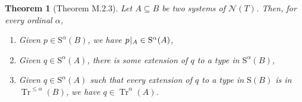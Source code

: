 \documentclass{article}
\newtheorem{theorem}{Theorem}[section]
\theoremstyle{nonumberplain}
\newcommand{\calN}{\mathcal{N}}
\newcommand{\Stone}{\mathrm{S}}
\DeclareMathOperator{\Tr}{Tr}
\newcommand{\rst}[2]{#1\mspace{1.3mu plus 0.5mu minus 0.5mu}|_{#2}}
\begin{document}
\begin{theorem}[Theorem M.2.3]\label{thm:2.3}
Let $A \subseteq B$ be two systems of $\calN(T)$. Then, for every ordinal $\alpha$,
\begin{enumerate}[label=(\roman*)]
\item\label{item:thm2.3:i} Given $p \in \Stone^\alpha(B)$, we have $\rst p A \in \Stone^\alpha(A)$,
\item\label{item:thm2.3:ii} Given $q \in \Stone^\alpha(A)$, there is some extension of $q$ to a type in $\Stone^\alpha(B)$,
\item\label{item:thm2.3:iii} Given $q \in \Stone^\alpha(A)$ such that every extension of $q$ to a type in $\Stone(B)$ is in $\Tr^{\leq\alpha}(B)$, we have $q \in \Tr^\alpha(A)$.
\end{enumerate}
\end{theorem}
\end{document}
